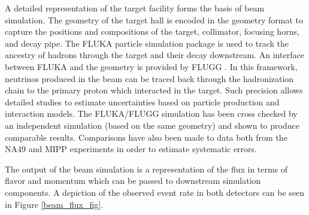 A detailed representation of the \numi target facility forms the basis
of beam simulation.
The geometry of the target hall is encoded in the \geant geometry format
to capture the positions and compositions of the target, collimator,
focusing horns, and decay pipe.
The FLUKA \cite{fluka} particle simulation package is used to track the
ancestry of hadrons through the target and their decay downstream.
An interface between FLUKA and the \geant geometry is provided
by  FLUGG \cite{campanella1999first}.
In this framework, neutrinos produced in the beam can be traced back
through the hadronization chain to the primary proton which interacted in the
target.
Such precision allows detailed studies to estimate uncertainties based
on particle production and interaction models.
The FLUKA/FLUGG simulation has been cross checked by an independent
\geant simulation (based on the same geometry) and shown to produce
comparable results.
Comparisons have also been made to data both from the NA49
\cite{gazdzicki2004report} and MIPP \cite{paley2014measurement}
experiments in order to estimate systematic errors.

The output of the beam simulation is a representation of the \numi flux
in terms of flavor and momentum which can be passed to downstream simulation
components.  A depiction of the observed event rate in both detectors can be
seen in Figure \ref{beam_flux_fig}.

